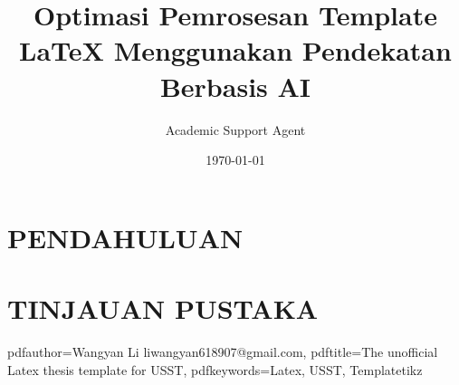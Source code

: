 \documentclass{thuthesis}
\title{Optimasi Pemrosesan Template LaTeX Menggunakan Pendekatan Berbasis AI}
\author{Academic Support Agent}
\date{\today}
\begin{document}
\maketitle

\begin{abstract}

\end{abstract}

\chapter{PENDAHULUAN}


\chapter{TINJAUAN PUSTAKA}




\usepackage{hyperref}%
\hypersetup
{
    pdfauthor={Wangyan Li liwangyan618907@gmail.com},
    pdftitle={The unofficial Latex thesis template for USST},
    pdfkeywords={Latex, USST, Templatetikz}
}


 
 
\usepackage{thuthesis}  
\usepackage[flushleft]{threeparttable}
\usepackage{makecell,booktabs}  
\usepackage{tikz}
\usepackage{hyperref}

\usetikzlibrary{arrows}
\usepackage{algorithm}
\renewcommand{\thealgorithm}{\thechapter.\arabic{algorithm}}

\graphicspath{{figures/}}

\end{document}
